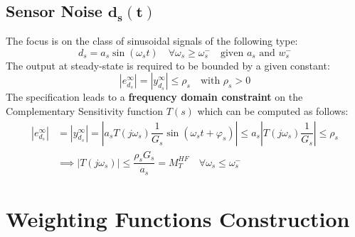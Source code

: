 \documentclass{article}
\numberwithin{equation}{subsection}
\begin{document}
	\subsection{Sensor Noise $\bm{d_s(t)}$}
	The focus is on the class of sinusoidal signals of the following type:
	\begin{equation}
		d_s = a_s\sin(\omega_st) \quad \forall\omega_s\geq\omega_s^- \quad \text{given } a_s \text{ and } w_s^-
	\end{equation}
	The output at steady-state is required to be bounded by a given constant:
	\begin{equation}
		\left| e_{d_s}^\infty \right| = \left| y_{d_s}^\infty \right| \leq \rho_s \quad \text{with } \rho_s>0
	\end{equation}
	The specification leads to a \textbf{frequency domain constraint} on the Complementary Sensitivity function $T(s)$ which can be computed as follows:
	\begin{align}
		\left| e_{d_s}^\infty \right| &= \left| y_{d_s}^\infty \right| = \left| a_sT(j\omega_s)\dfrac{1}{G_s}\sin(\omega_st+\varphi_s) \right| \leq a_s\left|T(j\omega_s)\dfrac{1}{G_s}\right| \leq \rho_s \nonumber \\
		&\implies \left|T(j\omega_s)\right| \leq \dfrac{\rho_sG_s}{a_s} = M_T^{HF} \quad \forall\omega_s \leq \omega_s^-
	\end{align}
	
	
	\section{Weighting Functions Construction}
\end{document}
